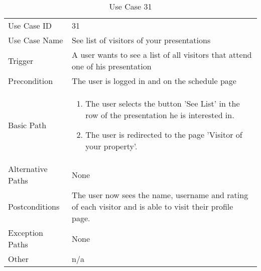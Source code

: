 \begin{table}[H]
\centering
\label{table-use-case-31}
\begin{tabular}{|p{3cm}|p{10cm}}
Use Case ID       & 31                                                        \\
Use Case Name     & See list of visitors of your presentations                            \\
Trigger           & A user wants to see a list of all visitors that attend one of his presentation\\
Precondition      & The user is logged in and on the schedule page             \\
Basic Path        & \begin{enumerate}
\item The user selects the button 'See List' in the row of the presentation he is
interested in.
\item The user is redirected to the page 'Visitor of your property'. 
\end{enumerate} 
     \\
Alternative Paths & None                          \\
Postconditions    & The user now sees the name, username and rating of each
visitor and is able to visit their profile page.	\\
Exception Paths   & None			\\
Other             & n/a                                                                                                                                                                                                        
\end{tabular}
\caption{Use Case 31}
\end{table}



